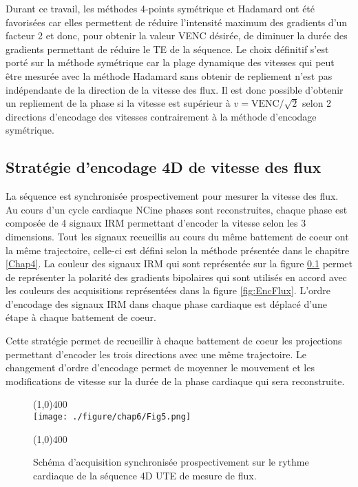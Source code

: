 Durant ce travail, les méthodes 4-points symétrique et Hadamard ont été favorisées car elles permettent de réduire l'intensité maximum des gradients d'un facteur 2 et donc, pour obtenir la valeur VENC désirée, de diminuer la durée des gradients permettant de réduire le TE de la séquence. Le choix définitif s'est porté sur la méthode symétrique car la plage dynamique des vitesses qui peut être mesurée avec la méthode Hadamard sans obtenir de repliement n'est pas indépendante de la direction de la vitesse des flux. Il est donc possible d'obtenir un repliement de la phase si la vitesse est supérieur à $v=\text{VENC}/\sqrt{2} $ selon 2 directions d'encodage des vitesses \cite{Pelc:1991aa} contrairement à la méthode d'encodage symétrique.

\subsection{Stratégie d'encodage 4D de vitesse des flux}


La séquence est synchronisée prospectivement pour mesurer la vitesse des flux. Au cours d'un cycle cardiaque NCine phases sont reconstruites, chaque phase est composée de 4 signaux IRM permettant d'encoder la vitesse selon les 3 dimensions. Tout les signaux recueillis au cours du même battement de coeur ont la même trajectoire, celle-ci est défini selon la méthode présentée dans le chapitre \ref{Chap4}. La couleur des signaux IRM qui sont représentée sur la figure \ref{} permet de représenter la polarité des gradients bipolaires qui sont utilisés en accord avec les couleurs des acquisitions représentées dans la figure \ref{fig:EncFlux}. L'ordre d'encodage des signaux IRM dans chaque phase cardiaque est déplacé d'une étape à chaque battement de coeur. 

Cette stratégie permet de recueillir à chaque battement de coeur les projections permettant d'encoder les trois directions avec une même trajectoire. Le changement d'ordre d'encodage permet de moyenner le mouvement et les modifications de vitesse sur la durée de la phase cardiaque qui sera reconstruite.

\begin{figure}[H]
\centering
\line(1,0){400} \\
\texttt{[image: ./figure/chap6/Fig5.png]}
\caption[Schéma acquisition flux]{\label{fig:SchemaAcqFlux} Schéma d'acquisition synchronisée prospectivement sur le rythme cardiaque de la séquence 4D UTE de mesure de flux.}
\line(1,0){400} \\ 
\end{figure}

